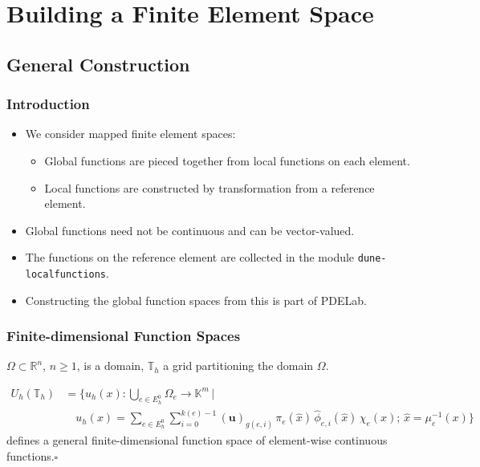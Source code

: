 \section{Building a Finite Element Space}\label{Sec:General}

\subsection{General Construction}

\begin{frame}
\frametitle{Introduction}
\begin{itemize}
\item We consider mapped finite element spaces: 
\begin{itemize}
\item Global functions are pieced together from local functions on each element.
\item Local functions are constructed by transformation from a reference element.
\end{itemize}
\item Global functions need not be continuous and can be vector-valued.
\item The functions on the reference element are collected in the module \lstinline{dune-localfunctions}.
\item Constructing the global function spaces from this is part of PDELab.
\end{itemize}
\end{frame}


\begin{frame}
\frametitle{Finite-dimensional Function Spaces}
$\Omega\subset\mathbb{R}^n$, $n\geq 1$, is a domain, 
$\mathbb{T}_h$ a grid partitioning the domain $\Omega$.

\begin{Def}\label{Def:Vh}
\begin{equation*}\label{Eq:GenericFESpace}
\begin{split}
U_h(\mathbb{T}_h) &= \Biggl\{ u_h(x) : \bigcup_{e\in E_h^0}\Omega_e
 \to \mathbb{K}^m\,\Bigg| \\
&\quad u_h(x) = \sum_{e\in E_h^0}\sum_{i=0}^{k(e)-1} (\mathbf{u})_{g(e,i)}
\, \pi_e(\hat{x}) \, \hat\phi_{e,i}(\hat{x}) \, \chi_e(x); \, \hat{x}=\mu_e^{-1}(x) 
 \Biggr\}
\end{split}
\end{equation*}
defines a general finite-dimensional function space of element-wise
continuous functions.\hfill$\square$ 
\end{Def}
\end{frame}

